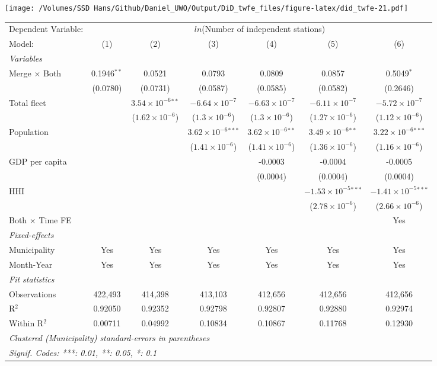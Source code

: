 \documentclass[
]{article}
\begin{document}
\texttt{[image: /Volumes/SSD Hans/Github/Daniel\_UWO/Output/DiD\_twfe\_files/figure-latex/did\_twfe-21.pdf]}

\begin{tabular}{lcccccc}
\tabularnewline\midrule\midrule
Dependent Variable:&\multicolumn{6}{c}{$ln$(Number of independent stations)}\\
Model:&(1) & (2) & (3) & (4) & (5) & (6)\\
\midrule \emph{Variables}&   &   &   &   &   &  \\
Merge $\times $ Both & 0.1946$^{**}$ & 0.0521 & 0.0793 & 0.0809 & 0.0857 & 0.5049$^{*}$\\
  &(0.0780) & (0.0731) & (0.0587) & (0.0585) & (0.0582) & (0.2646)\\
Total fleet &    & $3.54\times 10^{-6}$$^{**}$ & $-6.64\times 10^{-7}$ & $-6.63\times 10^{-7}$ & $-6.11\times 10^{-7}$ & $-5.72\times 10^{-7}$\\
  &   & ($1.62\times 10^{-6}$) & ($1.3\times 10^{-6}$) & ($1.3\times 10^{-6}$) & ($1.27\times 10^{-6}$) & ($1.12\times 10^{-6}$)\\
Population &    &    & $3.62\times 10^{-6}$$^{***}$ & $3.62\times 10^{-6}$$^{**}$ & $3.49\times 10^{-6}$$^{**}$ & $3.22\times 10^{-6}$$^{***}$\\
  &   &    & ($1.41\times 10^{-6}$) & ($1.41\times 10^{-6}$) & ($1.36\times 10^{-6}$) & ($1.16\times 10^{-6}$)\\
GDP per capita &    &    &    & -0.0003 & -0.0004 & -0.0005\\
  &   &    &    & (0.0004) & (0.0004) & (0.0004)\\
HHI &    &    &    &    & $-1.53\times 10^{-5}$$^{***}$ & $-1.41\times 10^{-5}$$^{***}$\\
  &   &    &    &    & ($2.78\times 10^{-6}$) & ($2.66\times 10^{-6}$)\\
Both $\times$ Time FE &  &  &  &  &  & Yes\\
\midrule \emph{Fixed-effects}&   &   &   &   &   &  \\
Municipality & Yes & Yes & Yes & Yes & Yes & Yes\\
Month-Year & Yes & Yes & Yes & Yes & Yes & Yes\\
\midrule \emph{Fit statistics}&  & & & & & \\
Observations & 422,493&414,398&413,103&412,656&412,656&412,656\\
R$^2$ & 0.92050&0.92352&0.92798&0.92807&0.92880&0.92974\\
Within R$^2$ & 0.00711&0.04992&0.10834&0.10867&0.11768&0.12930\\
\midrule\midrule\multicolumn{7}{l}{\emph{Clustered (Municipality) standard-errors in parentheses}}\\
\multicolumn{7}{l}{\emph{Signif. Codes: ***: 0.01, **: 0.05, *: 0.1}}\\
\end{tabular}
\end{document}
